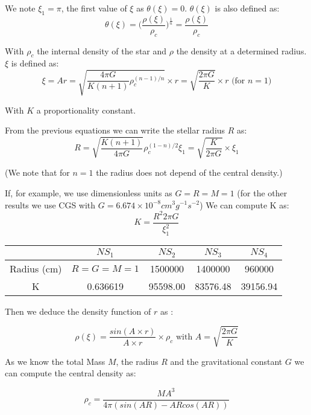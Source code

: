 \documentclass[notes.tex]{subfiles}
\begin{document}
We note $\xi_1 = \pi$, the first value of $\xi$ as $\theta(\xi) = 0$.
$\theta(\xi)$ is also defined as:
\begin{equation}
 \theta(\xi) = \Big(\frac{\rho(\xi)}{\rho_c}\Big)^{\frac{1}{n}}  = \frac{\rho(\xi)}{\rho_c}
\end{equation}

With $\rho_c$ the internal density of the star and $\rho$ the density at a determined radius. $\xi$ is defined as:
$$ \xi = Ar = \sqrt{\frac{4\pi G}{K(n+1)}\rho_c^{(n-1)/n}} \times r = \sqrt{\frac{2\pi G}{K}}\times r \mbox{ (for } n=1 \mbox{)}$$

With $K$ a proportionality constant.

From the previous equations we can write the stellar radius $R$ as:
\begin{equation}
R = \sqrt{\frac{K(n+1)}{4\pi G}}\rho_c^{(1-n)/2}\xi_1 = \sqrt{ \frac{K}{2\pi G} } \times \xi_1
\end{equation}

(We note that for $n=1$ the radius does not depend of the central density.)

If, for example, we use dimensionless units as $G=R=M=1$ (for the other results we use CGS with $G = 6.674 \times 10^{-8} cm^3g^{-1}s^{-2}$)
We can compute K as:
\begin{equation}
\label{eq:constant}
K = \frac{R^2  2 \pi G}{\xi_1^2}
\end{equation}

\begin{center}

\begin{tabular}{c|c|c|c|c|}
 & $NS_1$ & $NS_2$ & $NS_3$ & $NS_4$ \\
\hline
Radius (cm) & $R=G=M=1$ & 1500000 & 1400000 & 960000 \\
\hline
K & 0.636619 & 95598.00 & 83576.48 & 39156.94\\
\hline
\end{tabular}

\end{center}

Then we deduce the density function of $r$ as :

$$\rho(\xi) = \frac{sin(A\times r)}{A \times r} \times \rho_c \mbox{ with } A = \sqrt{\frac{2\pi G}{K}}
$$

As we know the total Mass $M$, the radius $R$ and the gravitational constant $G$ we can compute the central density as:

$$ \rho_c = \frac{M A^3}{4 \pi (sin(AR)-ARcos(AR)) } $$
\end{document}
